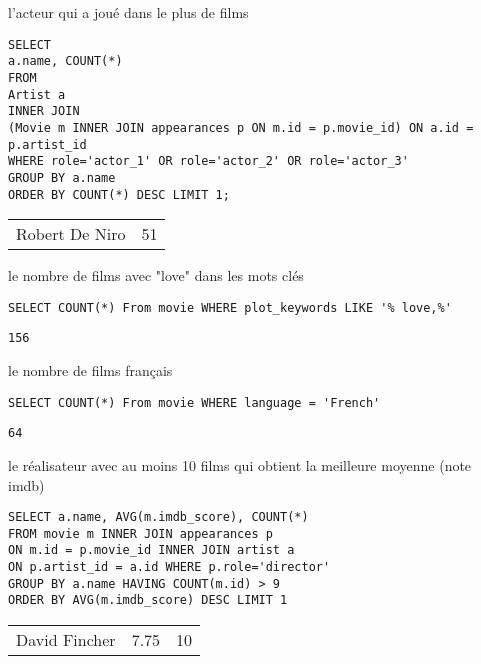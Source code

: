 \documentclass[french]{beamer}
\begin{document}
\begin{frame}[label={sec:org3efeda2},fragile]{l'acteur qui a joué dans le plus de films}
 \begin{verbatim}
SELECT
a.name, COUNT(*)
FROM
Artist a
INNER JOIN
(Movie m INNER JOIN appearances p ON m.id = p.movie_id) ON a.id = p.artist_id
WHERE role='actor_1' OR role='actor_2' OR role='actor_3'
GROUP BY a.name
ORDER BY COUNT(*) DESC LIMIT 1;
\end{verbatim}

\begin{center}
\begin{tabular}{lr}
Robert De Niro & 51\\
\end{tabular}
\end{center}
\end{frame}


\begin{frame}[label={sec:orgfaabb1c},fragile]{le nombre de films avec "love" dans les mots clés}
 \begin{verbatim}
SELECT COUNT(*) From movie WHERE plot_keywords LIKE '% love,%'
\end{verbatim}

\begin{verbatim}
156
\end{verbatim}
\end{frame}

\begin{frame}[label={sec:org859b5d7},fragile]{le nombre de films français}
 \begin{verbatim}
SELECT COUNT(*) From movie WHERE language = 'French'
\end{verbatim}

\begin{verbatim}
64
\end{verbatim}
\end{frame}


\begin{frame}[label={sec:orge155738},fragile]{le réalisateur avec au moins 10 films qui obtient la meilleure moyenne (note imdb)}
 \begin{verbatim}
SELECT a.name, AVG(m.imdb_score), COUNT(*)
FROM movie m INNER JOIN appearances p
ON m.id = p.movie_id INNER JOIN artist a
ON p.artist_id = a.id WHERE p.role='director'
GROUP BY a.name HAVING COUNT(m.id) > 9
ORDER BY AVG(m.imdb_score) DESC LIMIT 1
\end{verbatim}

\begin{center}
\begin{tabular}{lrr}
David Fincher & 7.75 & 10\\
\end{tabular}
\end{center}
\end{frame}
\end{document}
